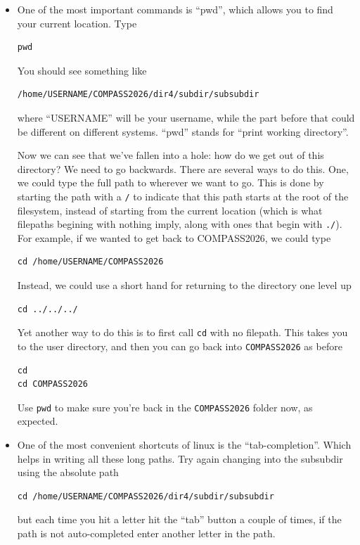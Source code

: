 \documentclass[aps,showpacs,prd,notitlepage,preprintnumbers,amsmath,amssymb,letterpaper]{revtex4}
\begin{document}
\begin{itemize}
\item One of the most
important commands is ``pwd'', which allows you to find your current
location. Type

\begin{verbatim}
pwd
\end{verbatim}

You should see something like

\begin{verbatim}
/home/USERNAME/COMPASS2026/dir4/subdir/subsubdir
\end{verbatim}

where ``USERNAME'' will be your username, while the part before that could be different on different systems. ``pwd'' stands for ``print working directory''.

Now we can see that we've fallen into a hole: how do we get out of this directory? We need to go backwards.
There are several ways to do this.
One, we could type the full path to wherever we want to go. This is done by starting the path with a \verb|/| to indicate that this path starts at the root of the filesystem, instead of starting from the current location (which is what filepaths begining with nothing imply, along with ones that begin with \verb|./|).
For example, if we wanted to get back to COMPASS2026, we could type

\begin{verbatim}
cd /home/USERNAME/COMPASS2026
\end{verbatim}

        Instead, we could use a short hand for returning to the directory one level up
\begin{verbatim}
cd ../../../
\end{verbatim}

        Yet another way to do this is to first call \verb|cd| with no filepath. This takes you to the user directory, and then you can go back into \verb|COMPASS2026| as before

\begin{verbatim}
cd
cd COMPASS2026
\end{verbatim}

        Use \verb|pwd| to make sure you're back in the \verb|COMPASS2026| folder now, as expected.

\item One of the most convenient shortcuts of linux is the
  ``tab-completion''. Which helps in writing all these long paths.
  Try again changing into the subsubdir using the absolute path

\begin{verbatim}
cd /home/USERNAME/COMPASS2026/dir4/subdir/subsubdir
\end{verbatim}

but each time you hit a letter hit the ``tab'' button a couple of
times, if the path is not auto-completed enter another letter in the
path.

\end{itemize}
\end{document}
